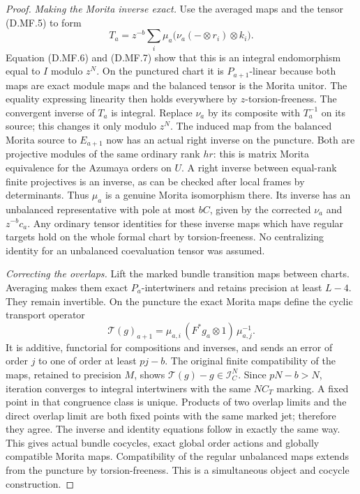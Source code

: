\begin{proof}
\emph{Making the Morita inverse exact.}
Use the averaged maps and the tensor (D.MF.5) to form
\[
 T_a=z^{-b}\sum_i\mu_a\bigl(\nu_a(-\otimes r_i)
                                  \otimes k_i\bigr).
                                                        \tag{D.MF.8}
\]
Equation (D.MF.6) and (D.MF.7) show that this is an
integral endomorphism equal to $I$ modulo $z^N$.
On the punctured chart it is $P_{a+1}$-linear because
both maps are exact module maps and the balanced tensor
is the Morita unitor. The equality expressing linearity
then holds everywhere by $z$-torsion-freeness.
The convergent inverse of $T_a$ is integral. Replace
$\nu_a$ by its composite with $T_a^{-1}$ on its source;
this changes it only modulo $z^N$.
The induced map from the balanced Morita source to
$E_{a+1}$ now has an actual right inverse on the puncture.
Both are projective modules of the same ordinary rank
$hr$: this is matrix Morita equivalence for the Azumaya
orders on $U$. A right inverse between equal-rank finite
projectives is an inverse, as can be checked after local
frames by determinants. Thus $\mu_a$ is a genuine Morita
isomorphism there. Its inverse has an unbalanced
representative with pole at most $bC$, given by the
corrected $\nu_a$ and $z^{-b}c_a$.
Any ordinary tensor identities for these inverse maps
which have regular targets hold on the whole formal
chart by torsion-freeness. No centralizing identity for
an unbalanced coevaluation tensor was assumed.

\emph{Correcting the overlaps.}
Lift the marked bundle transition maps between charts.
Averaging makes them exact $P_a$-intertwiners and retains
precision at least $L-4$. They remain invertible.
On the puncture the exact Morita maps define the
cyclic transport operator
\[
 \mathcal T(g)_{a+1}
       =\mu_{a,i}\,(F^*g_a\otimes1)\,\mu_{a,j}^{-1}.
                                                        \tag{D.MF.9}
\]
It is additive, functorial for compositions and inverses,
and sends an error of order $j$ to one of order at least
$pj-b$. The original finite compatibility of the maps,
retained to precision $M$, shows
$\mathcal T(g)-g\in\mathcal I_C^N$.
Since $pN-b>N$, iteration converges to integral
intertwiners with the same $NC_T$ marking.
A fixed point in that congruence class is unique.
Products of two overlap limits and the direct overlap
limit are both fixed points with the same marked jet;
therefore they agree. The inverse and identity equations
follow in exactly the same way. This gives actual bundle
cocycles, exact global order actions and globally compatible
Morita maps. Compatibility of the regular unbalanced maps
extends from the puncture by torsion-freeness.
This is a simultaneous object and cocycle construction.


\end{proof}
